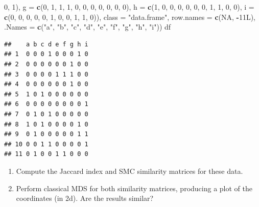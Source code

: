 \documentclass[
]{book}
\newenvironment{Shaded}{\begin{snugshade}}{\end{snugshade}}
\newcommand{\AttributeTok}[1]{\textcolor[rgb]{0.13,0.29,0.53}{#1}}
\newcommand{\ConstantTok}[1]{\textcolor[rgb]{0.56,0.35,0.01}{#1}}
\newcommand{\DataTypeTok}[1]{\textcolor[rgb]{0.13,0.29,0.53}{#1}}
\newcommand{\DecValTok}[1]{\textcolor[rgb]{0.00,0.00,0.81}{#1}}
\newcommand{\FunctionTok}[1]{\textcolor[rgb]{0.13,0.29,0.53}{\textbf{#1}}}
\newcommand{\NormalTok}[1]{#1}
\newcommand{\SpecialCharTok}[1]{\textcolor[rgb]{0.81,0.36,0.00}{\textbf{#1}}}
\newcommand{\StringTok}[1]{\textcolor[rgb]{0.31,0.60,0.02}{#1}}
\theoremstyle{definition}
\theoremstyle{definition}
\theoremstyle{definition}
\theoremstyle{definition}
\theoremstyle{remark}
\begin{document}
\begin{Shaded}
\begin{Highlighting}[]
\DecValTok{0}\NormalTok{, }\DecValTok{1}\NormalTok{), }\AttributeTok{g =} \FunctionTok{c}\NormalTok{(}\DecValTok{0}\NormalTok{, }\DecValTok{1}\NormalTok{, }\DecValTok{1}\NormalTok{, }\DecValTok{1}\NormalTok{, }\DecValTok{0}\NormalTok{, }\DecValTok{0}\NormalTok{, }\DecValTok{0}\NormalTok{, }\DecValTok{0}\NormalTok{, }\DecValTok{0}\NormalTok{, }\DecValTok{0}\NormalTok{, }\DecValTok{0}\NormalTok{), }\AttributeTok{h =} \FunctionTok{c}\NormalTok{(}\DecValTok{1}\NormalTok{, }\DecValTok{0}\NormalTok{, }\DecValTok{0}\NormalTok{, }
\DecValTok{0}\NormalTok{, }\DecValTok{0}\NormalTok{, }\DecValTok{0}\NormalTok{, }\DecValTok{0}\NormalTok{, }\DecValTok{1}\NormalTok{, }\DecValTok{1}\NormalTok{, }\DecValTok{0}\NormalTok{, }\DecValTok{0}\NormalTok{), }\AttributeTok{i =} \FunctionTok{c}\NormalTok{(}\DecValTok{0}\NormalTok{, }\DecValTok{0}\NormalTok{, }\DecValTok{0}\NormalTok{, }\DecValTok{0}\NormalTok{, }\DecValTok{0}\NormalTok{, }\DecValTok{1}\NormalTok{, }\DecValTok{0}\NormalTok{, }\DecValTok{0}\NormalTok{, }\DecValTok{1}\NormalTok{, }\DecValTok{1}\NormalTok{, }
\DecValTok{0}\NormalTok{)), }\AttributeTok{class =} \StringTok{"data.frame"}\NormalTok{, }\AttributeTok{row.names =} \FunctionTok{c}\NormalTok{(}\ConstantTok{NA}\NormalTok{, }\SpecialCharTok{{-}}\DecValTok{11}\DataTypeTok{L}\NormalTok{), }\AttributeTok{.Names =} \FunctionTok{c}\NormalTok{(}\StringTok{"a"}\NormalTok{, }
\StringTok{"b"}\NormalTok{, }\StringTok{"c"}\NormalTok{, }\StringTok{"d"}\NormalTok{, }\StringTok{"e"}\NormalTok{, }\StringTok{"f"}\NormalTok{, }\StringTok{"g"}\NormalTok{, }\StringTok{"h"}\NormalTok{, }\StringTok{"i"}\NormalTok{))}
\NormalTok{df}
\end{Highlighting}
\end{Shaded}

\begin{verbatim}
##    a b c d e f g h i
## 1  0 0 0 1 0 0 0 1 0
## 2  0 0 0 0 0 0 1 0 0
## 3  0 0 0 0 1 1 1 0 0
## 4  0 0 0 0 0 0 1 0 0
## 5  1 0 1 0 0 0 0 0 0
## 6  0 0 0 0 0 0 0 0 1
## 7  0 1 0 1 0 0 0 0 0
## 8  1 0 1 0 0 0 0 1 0
## 9  0 1 0 0 0 0 0 1 1
## 10 0 0 1 1 0 0 0 0 1
## 11 0 1 0 0 1 1 0 0 0
\end{verbatim}

\begin{enumerate}
\def\labelenumi{\roman{enumi}.}
\item
  Compute the Jaccard index and SMC similarity matrices for these data.
\item
  Perform classical MDS for both similarity matrices, producing a plot of the coordinates (in 2d). Are the results similar?
\end{enumerate}
\end{document}
